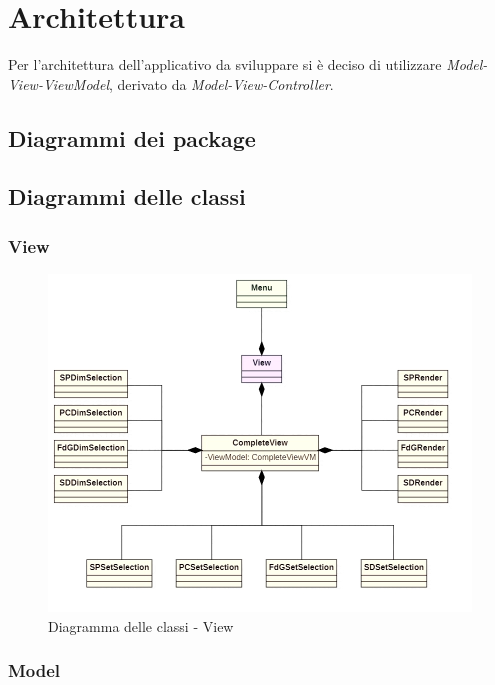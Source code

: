 \section{Architettura}

Per l'architettura dell'applicativo da sviluppare si è deciso di utilizzare \textit{Model-View-ViewModel}, derivato da \textit{Model-View-Controller}.

\subsection{Diagrammi dei package}
\subsection{Diagrammi delle classi}

\subsubsection{View}

\begin{figure}[h!]
    \centering
    \includegraphics[scale=0.75]{../../assets/classi_uml/View.jpg}
    \caption{Diagramma delle classi - View}
\end{figure}
\newpage
\subsubsection{Model}

